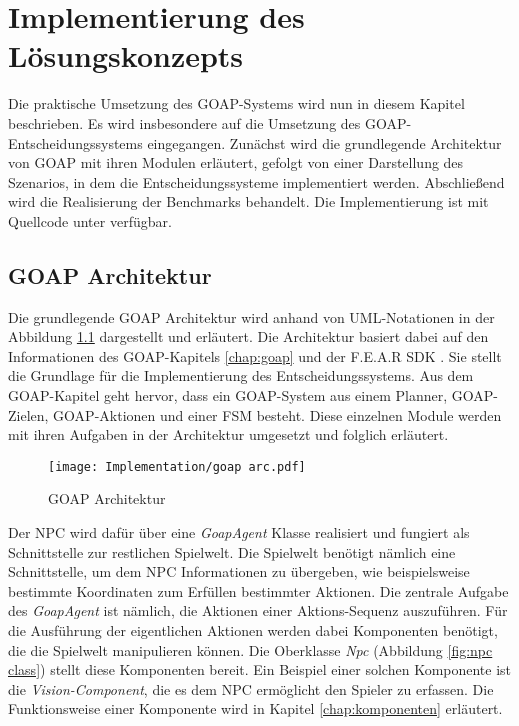 \chapter{Implementierung des Lösungskonzepts}
\label{chap:implementierung lk}

Die praktische Umsetzung des GOAP-Systems wird nun in diesem Kapitel beschrieben. Es wird insbesondere auf die Umsetzung des GOAP-Entscheidungssystems eingegangen. Zunächst wird die grundlegende Architektur von GOAP mit ihren Modulen erläutert, gefolgt von einer Darstellung des Szenarios, in dem die Entscheidungssysteme implementiert werden. Abschlie\ss{}end wird die Realisierung der Benchmarks behandelt. Die Implementierung ist mit Quellcode unter \autocite{oleg} verfügbar.





\section{GOAP Architektur}
\label{chap:goap architektur}


Die grundlegende GOAP Architektur wird anhand von UML-Notationen in der Abbildung \ref{fig:GOAP Architektur} dargestellt und erläutert. Die Architektur basiert dabei auf den Informationen des GOAP-Kapitels \ref{chap:goap} und der F.E.A.R SDK \autocite{fearsdk}. Sie stellt die Grundlage für die Implementierung des Entscheidungssystems. Aus dem GOAP-Kapitel geht hervor, dass ein GOAP-System aus einem Planner, GOAP-Zielen, GOAP-Aktionen und einer FSM besteht. Diese einzelnen Module werden mit ihren Aufgaben in der Architektur umgesetzt und folglich erläutert.

\begin{figure}[h]
  \centering
  \texttt{[image: Implementation/goap arc.pdf]}
	\captionsetup{justification=justified, format=plain}
  \caption{GOAP Architektur}
  \label{fig:GOAP Architektur}
\end{figure}

Der NPC wird dafür über eine \textit{GoapAgent} Klasse realisiert und fungiert als Schnittstelle zur restlichen Spielwelt. Die Spielwelt benötigt nämlich eine Schnittstelle, um dem NPC Informationen zu übergeben, wie beispielsweise bestimmte Koordinaten zum Erfüllen bestimmter Aktionen. Die zentrale Aufgabe des \textit{GoapAgent} ist nämlich, die Aktionen einer Aktions-Sequenz auszuführen. Für die Ausführung der eigentlichen Aktionen werden dabei Komponenten benötigt, die die Spielwelt manipulieren können. Die Oberklasse \textit{Npc} (Abbildung \ref{fig:npc class}) stellt diese Komponenten bereit. Ein Beispiel einer solchen Komponente ist die \textit{Vision-Component}, die es dem NPC ermöglicht den Spieler zu erfassen. Die Funktionsweise einer Komponente wird in Kapitel \ref{chap:komponenten} erläutert.

